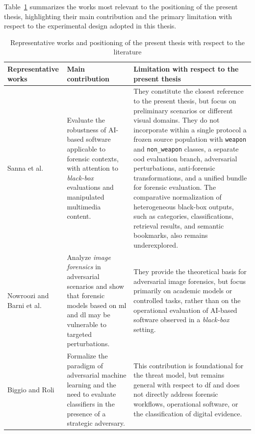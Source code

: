 Table~\ref{tab:sota-representative-works} summarizes the works most relevant
to the positioning of the present thesis, highlighting their main contribution
and the primary limitation with respect to the experimental design adopted in
this thesis.

\begin{table}[htbp]
\centering
\footnotesize
\caption{Representative works and positioning of the present thesis with respect to the literature}
\label{tab:sota-representative-works}
\begin{tabularx}{\textwidth}{@{}p{3.8cm} X X@{}}
\toprule
\textbf{Representative works} &
\textbf{Main contribution} &
\textbf{Limitation with respect to the present thesis} \\
\midrule

Sanna et al.~\cite{sanna2024preliminary,sanna2025pixelperfect} &
Evaluate the robustness of AI-based software applicable to forensic contexts,
with attention to \textit{black-box} evaluations and manipulated multimedia content. &
They constitute the closest reference to the present thesis, but focus on
preliminary scenarios or different visual domains. They do not incorporate
within a single protocol a frozen source population with \texttt{weapon} and
\texttt{non\_weapon} classes, a separate \gls{ood} evaluation branch,
adversarial perturbations, anti-forensic transformations, and a unified bundle
for forensic evaluation. The comparative normalization of heterogeneous
black-box outputs, such as categories, classifications, retrieval results, and
semantic bookmarks, also remains underexplored.\\
\midrule

Nowroozi and Barni et al.~\cite{nowroozi2020phd,barni2018cf} &
Analyze \textit{image forensics} in adversarial scenarios and show that
forensic models based on \gls{ml} and \gls{dl} may be vulnerable to targeted
perturbations. &
They provide the theoretical basis for adversarial image forensics, but focus
primarily on academic models or controlled tasks, rather than on the operational
evaluation of AI-based software observed in a \textit{black-box} setting. \\

\midrule

Biggio and Roli~\cite{biggio2018wild} &
Formalize the paradigm of adversarial machine learning and the need to evaluate
classifiers in the presence of a strategic adversary. &
This contribution is foundational for the threat model, but remains general
with respect to \gls{df} and does not directly address forensic workflows,
operational software, or the classification of digital evidence. \\


\end{tabularx}
\end{table}
